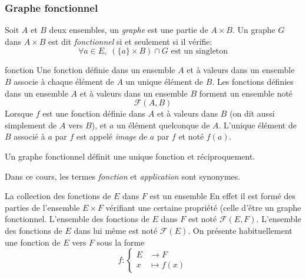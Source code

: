 \subsubsection{Graphe fonctionnel}
 
\begin{defi}
Soit $A$ et $B$ deux ensembles, un \emph{graphe} est une partie de $A\times B$. Un graphe $G$ dans $A\times B$ est dit \emph{fonctionnel} si et seulement si il vérifie:
\begin{displaymath}
  \forall a\in E,\;\left( \{a\}\times B\right) \cap G \text{ est un singleton}
\end{displaymath}  
\end{defi}
\begin{defi}
\item[fonction] Une fonction définie dans un ensemble $A$ et à valeurs dans un ensemble $B$ associe à chaque élément de $A$ un unique élément de $B$. Les fonctions définies dans un ensemble $A$ et à valeurs dans un ensemble $B$ forment un ensemble noté
\begin{displaymath}
 \mathcal F (A,B)
\end{displaymath}
Lorsque $f$ est une fonction définie dans $A$ et à valeurs dans $B$ (on dit aussi simplement de $A$ vers $B$), et $a$ un élément quelconque de $A$. L'unique élément de $B$ associé à $a$ par $f$ est appelé \emph{image} de $a$ par $f$ et noté $f(a)$.
\end{defi}

Un graphe fonctionnel définit une unique fonction et réciproquement.

Dans ce cours, les termes \emph{fonction} et \emph{application} sont synonymes.

La collection des fonctions de $E$ dans $F$ est un ensemble En effet il est formé des parties de l'ensemble $E\times F$ vérifiant une certaine propriété (celle d'être un graphe fonctionnel. L'ensemble des fonctions de $E$ dans $F$ est noté $\mathcal F(E,F)$. L'ensemble des fonctions de $E$ dans lui même est noté $\mathcal{F}(E)$.
\newline
On présente habituellement une fonction de $E$ vers $F$ sous la forme 
\begin{displaymath}
 f:
\left\lbrace 
\begin{aligned}
 E &\rightarrow F \\ x &\mapsto f(x)
\end{aligned}
\right. 
\end{displaymath}


